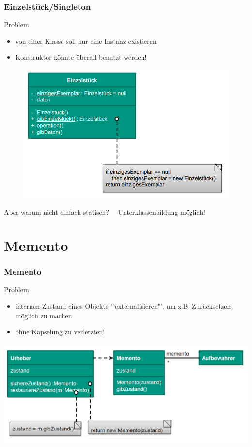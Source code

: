 \documentclass[18pt]{beamer}
\begin{document}
	\begin{frame}
		\frametitle{Einzelstück/Singleton}
		\begin{block}{Problem}
			\begin{itemize}
				\item von einer Klasse soll nur eine Instanz existieren
				\item Konstruktor könnte überall benutzt werden!
			\end{itemize}
		\end{block}
		\pause
		\centering
		\begin{figure}
			\includegraphics[scale=0.3]{./pics/tut4/singleton.png}
		\end{figure}
		\pause
		Aber warum nicht einfach statisch?\pause ~~ Unterklassenbildung möglich!
	\end{frame}

	\section{Memento}
	\begin{frame}
		\frametitle{Memento}
		\begin{block}{Problem}
			\begin{itemize}
				\item internen Zustand eines Objekts "'externalisieren"', um z.B. Zurücksetzen möglich zu machen \pause 
				\item ohne Kapselung zu verletzten!
			\end{itemize}
		\end{block}
		\pause
		\centering
		\includegraphics[scale=0.4]{./pics/tut4/mem.png}
	\end{frame}
\end{document}
